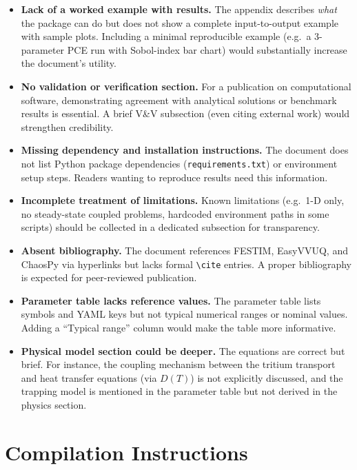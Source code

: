 \documentclass[11pt,a4paper]{article}
\begin{document}
\begin{itemize}[nosep]
  \item \textbf{Lack of a worked example with results.}  The appendix
    describes \emph{what} the package can do but does not show a complete
    input-to-output example with sample plots.  Including a minimal
    reproducible example (e.g.\ a 3-parameter PCE run with
    Sobol-index bar chart) would substantially increase the document's
    utility.
  \item \textbf{No validation or verification section.}  For a
    publication on computational software, demonstrating agreement with
    analytical solutions or benchmark results is essential.  A brief V\&V
    subsection (even citing external work) would strengthen credibility.
  \item \textbf{Missing dependency and installation instructions.}
    The document does not list Python package dependencies
    (\texttt{requirements.txt}) or environment setup steps.  Readers
    wanting to reproduce results need this information.
  \item \textbf{Incomplete treatment of limitations.}
    Known limitations (e.g.\ 1-D only, no steady-state coupled problems,
    hardcoded environment paths in some scripts) should be collected in
    a dedicated subsection for transparency.
  \item \textbf{Absent bibliography.}  The document references FESTIM,
    EasyVVUQ, and ChaosPy via hyperlinks but lacks formal
    \texttt{\textbackslash cite} entries.  A proper bibliography is
    expected for peer-reviewed publication.
  \item \textbf{Parameter table lacks reference values.}
    The parameter table lists symbols and YAML keys but not typical
    numerical ranges or nominal values.  Adding a ``Typical range''
    column would make the table more informative.
  \item \textbf{Physical model section could be deeper.}  The equations
    are correct but brief.  For instance, the coupling mechanism between
    the tritium transport and heat transfer equations (via $D(T)$) is not
    explicitly discussed, and the trapping model is mentioned in the
    parameter table but not derived in the physics section.
\end{itemize}


\section{Compilation Instructions}
\label{sec:compilation}
\end{document}
